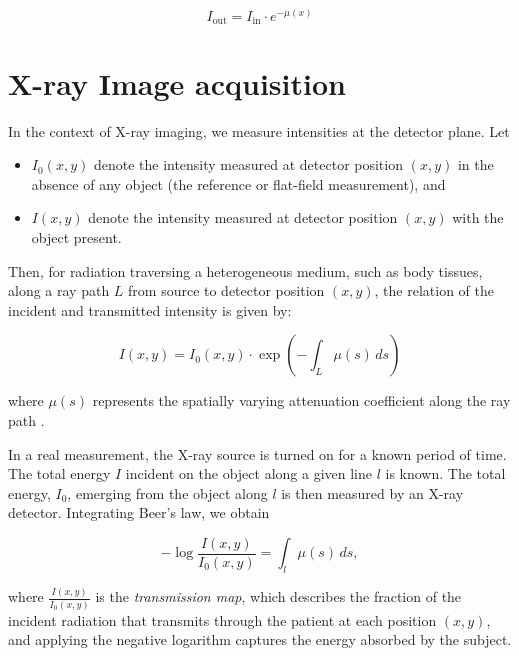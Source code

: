 \documentclass[nomenclature, english, bibtex]{kththesis}
\numberwithin{listing}{chapter}
\begin{document}
\begin{equation}
I_{\text{out}} = I_{\text{in}} \cdot e^{-\mu(x)}
\label{eq:beer_lambert}
\end{equation}

\section{X-ray Image acquisition}

In the context of X-ray imaging, we measure intensities at the detector plane. Let

\begin{itemize}
\item $I_0(x,y)$ denote the intensity measured at detector position $(x,y)$ in the absence
    of any object (the reference or flat-field measurement), and
\item $I(x,y)$ denote the intensity measured at detector position $(x,y)$ with the object present.
\end{itemize}

Then, for radiation traversing a heterogeneous medium, such as body tissues, along a ray path $L$
from source to detector position $(x,y)$, the relation of the incident and transmitted intensity is
given by:

\begin{equation}
I(x,y) = I_0(x,y) \cdot \exp\left(-\int_L \mu(s) \, ds\right)
\label{eq:beer_lambert_imaging}
\end{equation}

where $\mu(s)$ represents the spatially varying attenuation coefficient along the ray path \cite[p.~57]{epstein2008}.

In a real measurement, the X-ray source is turned on for a known period of time. The total energy
$I$ incident on the object along a given line $l$ is known. The total energy, $I_0$, emerging from the object
along $l$ is then measured by an X-ray detector. Integrating Beer’s law, we obtain \cite[p.~60]{epstein2008}

\begin{equation}
    -\log \frac{I(x,y)}{I_0(x,y)} = \int_l \mu(s) \, ds,
\end{equation}

where $\frac{I(x, y)}{I_0(x, y)}$ is the \textit{transmission map}, which describes the fraction of the
incident radiation that transmits through the patient at each position $(x, y)$, and applying
the negative logarithm captures the energy absorbed by the subject.
\end{document}
